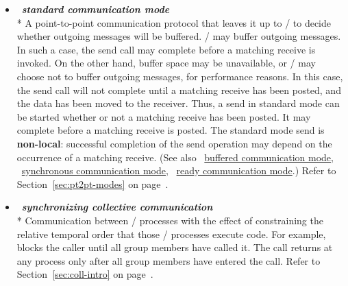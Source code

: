 \begin{itemize}
\label{glossary:standard_communication_mode}
\item  ~\hypertarget{glossary:standard_communication_mode}{\emph{\textbf{standard communication mode}}} \\*
A point-to-point communication protocol that leaves it up to \MPI/ to decide whether outgoing
messages will be buffered.  \MPI/ may
buffer outgoing messages.  In such a case, the send call may complete
before a matching receive is invoked.  On the other hand, buffer space may be
unavailable, or \MPI/ may choose not to buffer
outgoing messages, for performance reasons. In this case,
the send call will not complete until a matching receive has been posted, and
the data has been moved to the receiver.
Thus, a send in standard mode can be started whether or not a
matching receive has been posted.  It may complete before a matching receive
is posted.  The
standard mode send is {\bf non-local}:  successful completion of the send
operation may depend on the occurrence of a matching receive. 
(See also ~\hyperlink{glossary:buffered_communication_mode}{buffered communication mode}, 
~\hyperlink{glossary:synchronous_communication_mode}{synchronous communication mode},
~\hyperlink{glossary:ready_communication_mode}{ready communication mode}.)
Refer to Section~\ref{sec:pt2pt-modes} on page~\pageref{sec:pt2pt-modes}.

\label{glossary:synchronizing_collective_communication}
\item  ~\hypertarget{glossary:synchronizing_collective_communication}{\emph{\textbf{synchronizing collective communication}}} \\*
Communication between \MPI/ processes with the effect of constraining the relative temporal
order that those \MPI/  processes execute code. For example,  
blocks the caller until all group members have called it. The call returns at any process 
only after all group members have
entered the call.
Refer to Section~\ref{sec:coll-intro} on page~\pageref{sec:coll-intro}.


\end{itemize}
